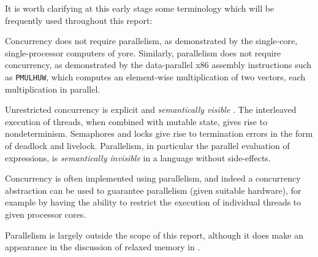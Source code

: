 It is worth clarifying at this early stage some terminology which will
be frequently used throughout this report:



Concurrency does not require parallelism, as demonstrated by the
single-core, single-processor computers of yore. Similarly,
parallelism does not require concurrency, as demonstrated by the
data-parallel x86 assembly instructions such as \verb|PMULHUW|, which
computes an element-wise multiplication of two vectors, each
multiplication in parallel.

Unrestricted concurrency is explicit and \emph{semantically visible}
\citep{concurrent}. The interleaved execution of threads, when
combined with mutable state, gives rise to nondeterminism. Semaphores
and locks give rise to termination errors in the form of deadlock and
livelock. Parallelism, in particular the parallel evaluation of
expressions, is \emph{semantically invisible} in a language without
side-effects.

Concurrency is often implemented using parallelism, and indeed a
concurrency abstraction can be used to guarantee parallelism (given
suitable hardware), for example by having the ability to restrict the
execution of individual threads to given processor cores.

Parallelism is largely outside the scope of this report, although it
does make an appearance in the discussion of relaxed memory in
.
